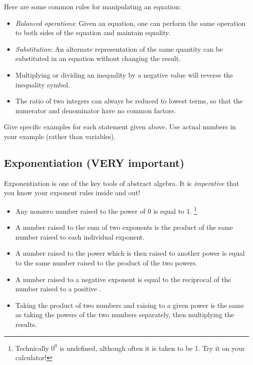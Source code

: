 Here are some common rules for manipulating an equation:

\begin {itemize}
\item
\emph{Balanced operations}: Given an equation, one can perform the same operation to both sides of the equation and maintain equality.  
\item
\emph{Substitution}: An alternate representation of the same quantity can be substituted in an equation without changing the result. 
\item
Multiplying or dividing an inequality by a negative value will reverse the inequality symbol.
\item
The ratio of two integers can always be reduced to lowest terms, so that the numerator and denominator have no common factors.
\end {itemize}
\begin{exercise}{4}
Give specific examples for each statement  given above. Use actual numbers in your example (rather than variables).
\end{exercise}


%
%

\subsection {Exponentiation (VERY important)}

Exponentiation is one of the key tools of abstract algebra. It is \emph{imperative} that you know your exponent rules inside and out!  

\begin{itemize}
\item
Any nonzero number raised to the power of 0 is equal to 1.
\footnote{ Technically $0^0$ is undefined, although often it is taken to be 1. Try it on your calculator!}
\item
A number raised to the sum of two exponents  is the product of the same number raised to each individual exponent.
\item
A number raised to the power which is then raised to another power is equal to the same number raised to the product of the two powers.
\item
A number raised to a negative exponent is equal to the reciprocal of the number  raised to a positive .
\item
Taking the  product of two numbers  and raising to a given power is the same as taking the powers of the two numbers separately, then multiplying the results.
\end{itemize}

